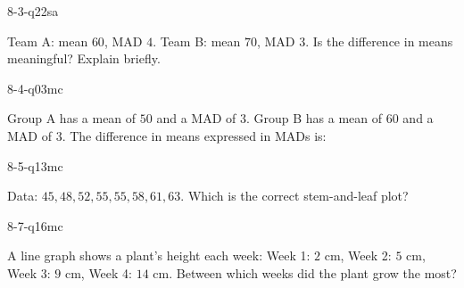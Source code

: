 \begin{practiceQuestion}{8-3-q22}{sa}
\begin{questionText}
Team A: mean $60$, MAD $4$. Team B: mean $70$, MAD $3$. Is the difference in means meaningful? Explain briefly.
\end{questionText}
\end{practiceQuestion}

\begin{practiceQuestion}{8-4-q03}{mc}
\begin{questionText}
Group A has a mean of $50$ and a MAD of $3$. Group B has a mean of $60$ and a MAD of $3$. The difference in means expressed in MADs is:
\end{questionText}
\end{practiceQuestion}

\begin{practiceQuestion}{8-5-q13}{mc}
\begin{questionText}
Data: $45, 48, 52, 55, 55, 58, 61, 63$. Which is the correct stem-and-leaf plot?
\end{questionText}
\end{practiceQuestion}

\begin{practiceQuestion}{8-7-q16}{mc}
\begin{questionText}
A line graph shows a plant's height each week: Week 1: $2$ cm, Week 2: $5$ cm, Week 3: $9$ cm, Week 4: $14$ cm. Between which weeks did the plant grow the most?
\end{questionText}
\end{practiceQuestion}

